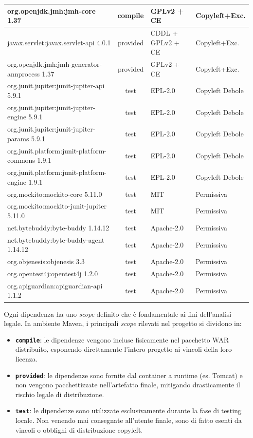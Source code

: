 \begin{longtable}{>{\ttfamily\footnotesize}p{4.8cm} c >{\footnotesize}p{4.2cm} l}
\rowcolor{yellow!15}
org.openjdk.jmh:jmh-core 1.37 & compile & GPLv2 + CE & Copyleft+Exc. \\
\midrule
javax.servlet:javax.servlet-api 4.0.1 & provided & CDDL + GPLv2 + CE & Copyleft+Exc. \\
org.openjdk.jmh:jmh-generator-annprocess 1.37 & provided & GPLv2 + CE & Copyleft+Exc. \\
\midrule
org.junit.jupiter:junit-jupiter-api 5.9.1 & test & EPL-2.0 & Copyleft Debole \\
org.junit.jupiter:junit-jupiter-engine 5.9.1 & test & EPL-2.0 & Copyleft Debole \\
org.junit.jupiter:junit-jupiter-params 5.9.1 & test & EPL-2.0 & Copyleft Debole \\
org.junit.platform:junit-platform-commons 1.9.1 & test & EPL-2.0 & Copyleft Debole \\
org.junit.platform:junit-platform-engine 1.9.1 & test & EPL-2.0 & Copyleft Debole \\
org.mockito:mockito-core 5.11.0 & test & MIT & Permissiva \\
org.mockito:mockito-junit-jupiter 5.11.0 & test & MIT & Permissiva \\
net.bytebuddy:byte-buddy 1.14.12 & test & Apache-2.0 & Permissiva \\
net.bytebuddy:byte-buddy-agent 1.14.12 & test & Apache-2.0 & Permissiva \\
org.objenesis:objenesis 3.3 & test & Apache-2.0 & Permissiva \\
org.opentest4j:opentest4j 1.2.0 & test & Apache-2.0 & Permissiva \\
org.apiguardian:apiguardian-api 1.1.2 & test & Apache-2.0 & Permissiva \\
\end{longtable}

Ogni dipendenza ha uno \textit{scope} definito che è fondamentale ai fini dell'analisi legale. In ambiente Maven, i principali \textit{scope} rilevati nel progetto si dividono in:
\begin{itemize}
    \item \textbf{\texttt{compile}}: le dipendenze vengono incluse fisicamente nel pacchetto WAR distribuito, esponendo direttamente l'intero progetto ai vincoli della loro licenza.
    \item \textbf{\texttt{provided}}: le dipendenze sono fornite dal container a runtime (es. Tomcat) e non vengono pacchettizzate nell'artefatto finale, mitigando drasticamente il rischio legale di distribuzione.
    \item \textbf{\texttt{test}}: le dipendenze sono utilizzate esclusivamente durante la fase di testing locale. Non venendo mai consegnate all'utente finale, sono di fatto esenti da vincoli o obblighi di distribuzione copyleft.
\end{itemize}

